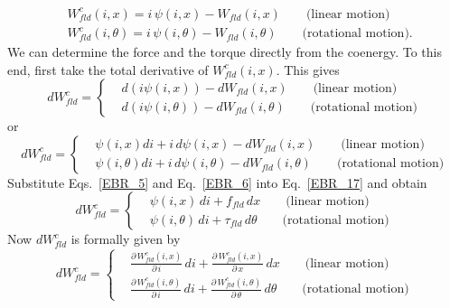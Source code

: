 \documentclass[12pt,a4paper,oneside]{book}
\begin{document}
\begin{onehalfspace}
 \begin{equation}\label{EBR_15}
\boxed{\begin{aligned}
 		&W_{fld}^c(i,x) = i\,\psi(i,x)-W_{fld}(i,x) \qquad \text{(linear motion)} \\[8pt]
 		&W_{fld}^c(i,\theta) = i\,\psi(i,\theta)-W_{fld}(i,\theta) \qquad \text{(rotational motion).} 
 	\end{aligned}}
 \end{equation} 
We can determine the force and the torque directly from the coenergy. To this end, first take the total derivative of $W_{fld}^c(i,x)$. This gives
\begin{equation}\label{EBR_16}
	dW_{fld}^c  = \left\{
	\begin{aligned}
		&d(i\psi(i,x))-dW_{fld}(i,x) \qquad \text{(linear motion)} \\[8pt]
		&d(i\psi(i,\theta))-dW_{fld}(i,\theta) \qquad \text{(rotational motion)} 
	\end{aligned}\right.
\end{equation} 
or 
\begin{equation}\label{EBR_17}
	dW_{fld}^c  = \left\{
	\begin{aligned}
		&\psi(i,x)di + i\,d\psi(i,x) - dW_{fld}(i,x) \qquad \text{(linear motion)} \\[8pt]
		&\psi(i,\theta)di + i\,d\psi(i,\theta) - dW_{fld}(i,\theta) \qquad \text{(rotational motion)} 
	\end{aligned}\right.
\end{equation} 
Substitute Eqs.~\eqref{EBR_5} and Eq.~\eqref{EBR_6} into Eq.~\eqref{EBR_17} and obtain
\begin{equation}\label{EBR_18}
	dW_{fld}^c  = \left\{
	\begin{aligned}
		&\psi(i,x)\,di + f_{fld}\,dx \qquad \text{(linear motion)} \\[8pt]
		&\psi(i,\theta)\,di + \tau_{fld}\,d\theta \qquad \text{(rotational motion)} 
	\end{aligned}\right.
\end{equation} 
Now $dW_{fld}^c$ is formally given by
\begin{equation}\label{EBR_19}
	dW_{fld}^c  = \left\{
	\begin{aligned}
		&\frac{\partial\,W_{fld}^c(i,x)}{\partial\,i}\,di +  \frac{\partial\,W_{fld}^c(i,x)}{\partial\,x}\,dx \qquad \text{(linear motion)} \\[8pt]
		&\frac{\partial\,W_{fld}^c(i,\theta)}{\partial\,i}\,di +  \frac{\partial\,W_{fld}^c(i,\theta)}{\partial\,\theta}\,d\theta \qquad \text{(rotational motion)} 

\end{aligned}
\end{equation}
\end{onehalfspace}
\end{document}
